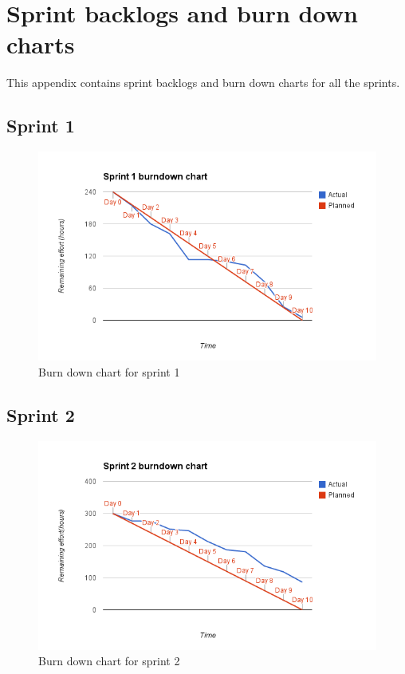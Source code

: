 \chapter{Sprint backlogs and burn down charts}
This appendix contains sprint backlogs and burn down charts for all the sprints.

\section{Sprint 1}
\begin{figure}[H]
\includegraphics[width=\textwidth]{appendix/backlog/burndown1.png}
\caption{Burn down chart for sprint 1}
\end{figure}


\section{Sprint 2}
\begin{figure}[H]
\includegraphics[width=\textwidth]{appendix/backlog/burndown2.png}
\caption{Burn down chart for sprint 2}
\end{figure}


